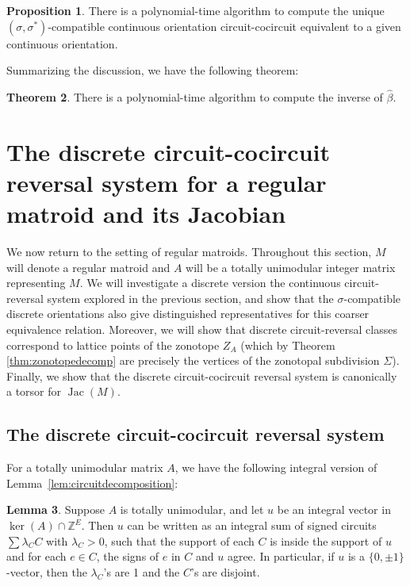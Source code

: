 \documentclass[12pt]{amsart}
\numberwithin{equation}{section}
\theoremstyle{definition}
\newtheorem{theorem}{Theorem}[subsection]
\newtheorem{lemma}[theorem]{Lemma}
\newtheorem{proposition}[theorem]{Proposition}
\newcommand{\Jac}{\operatorname{Jac}}
\begin{document}
\begin{proposition} \label{prop:CCMalgo}
There is a polynomial-time algorithm to compute the unique $(\sigma,\sigma^*)$-compatible continuous orientation circuit-cocircuit equivalent to a given continuous orientation.
\end{proposition}

Summarizing the discussion, we have the following theorem:

\begin{theorem} \label{prop:invalgo}
There is a polynomial-time algorithm to compute the inverse of $\hat{\beta}$.
\end{theorem}

\section{The discrete circuit-cocircuit reversal system for a regular matroid and its Jacobian}\label{discretestuffforregularmatroids}

We now return to the setting of regular matroids.  
Throughout this section, $M$ will denote a regular matroid and $A$ will be a totally unimodular integer matrix representing $M$.
We will investigate a discrete version the continuous circuit-reversal system explored in the previous section, and show that the $\sigma$-compatible discrete orientations also give distinguished representatives for this coarser equivalence relation.  Moreover, we will show that discrete circuit-reversal classes correspond to lattice points of the zonotope $Z_A$ (which by Theorem \ref{thm:zonotopedecomp} are precisely the vertices of the zonotopal subdivision $\Sigma$).  Finally, we show that the discrete circuit-cocircuit reversal system is canonically a torsor for $\Jac(M)$.

\subsection{The discrete circuit-cocircuit reversal system}\label{dccrs}

For a totally unimodular matrix $A$, we have the following integral version of Lemma~\ref{lem:circuitdecomposition}:

\begin{lemma} \label{lem:regularcircuitdecomposition}
Suppose $A$ is totally unimodular, and let $u$ be an integral vector in $\ker(A)\cap\mathbb{Z}^E$. Then $u$ can be written as an integral sum of signed circuits $\sum \lambda_C C$ with $\lambda_C>0$, such that the support of each $C$ is inside the support of $u$ and for each $e\in C$, the signs of $e$ in $C$ and $u$ agree. In particular, if $u$ is a $\{ 0, \pm 1 \}$-vector, then the $\lambda_C$'s are 1 and the $C$'s are disjoint.
\end{lemma}
\end{document}
